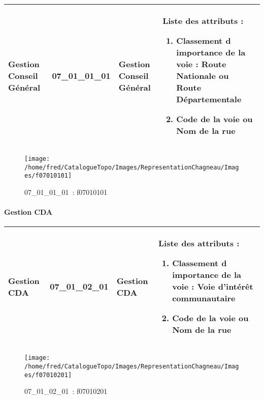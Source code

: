 \documentclass[12pt,titlepage]{book}
\begin{document}
\renewcommand{\arraystretch}{1.2}
\begin{supertabular}{|p{10cm}|c|p{13cm}|p{12cm}|}
 Gestion Conseil Général & 07\_01\_01\_01 & Gestion Conseil Général & Liste des attributs :
\begin{enumerate}
  \item Classement d importance de la voie : Route Nationale ou Route Départementale  \item Code de la voie ou Nom de la rue\end{enumerate}
\\
\hline
\end{supertabular}
\begin{figure}[h!]
  \hfill         %
  \begin{minipage}[t]{3cm}
    \begin{center}
      \texttt{[image: /home/fred/CatalogueTopo/Images/RepresentationChagneau/Images/f07010101]}
      \caption[~07\_01\_01\_01]{\small{07\_01\_01\_01~:} \tiny{f07010101}}\label{f07010101}
    \end{center}
  \end{minipage}
\end{figure}


\paragraph{Gestion CDA}
\noindent
\vspace{\baselineskip}

\renewcommand{\arraystretch}{1.2}
\begin{supertabular}{|p{10cm}|c|p{13cm}|p{12cm}|}
 Gestion CDA & 07\_01\_02\_01 & Gestion CDA & Liste des attributs :
\begin{enumerate}
  \item Classement d importance de la voie : Voie d'intérêt communautaire  \item Code de la voie ou Nom de la rue\end{enumerate}
\\
\hline
\end{supertabular}
\begin{figure}[h!]
  \hfill         %
  \begin{minipage}[t]{3cm}
    \begin{center}
      \texttt{[image: /home/fred/CatalogueTopo/Images/RepresentationChagneau/Images/f07010201]}
      \caption[~07\_01\_02\_01]{\small{07\_01\_02\_01~:} \tiny{f07010201}}\label{f07010201}
    \end{center}
  \end{minipage}
\end{figure}
\end{document}
